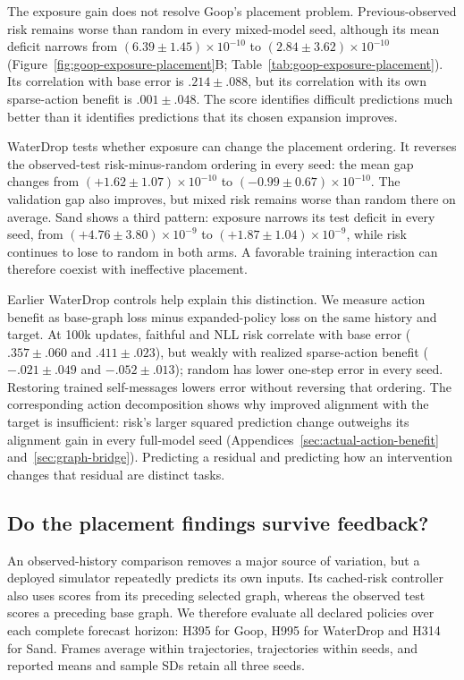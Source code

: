 The exposure gain does not resolve Goop's placement problem. Previous-observed risk remains worse than random in every mixed-model seed, although its mean deficit narrows from $(6.39\pm1.45)\times10^{-10}$ to $(2.84\pm3.62)\times10^{-10}$ (Figure~\ref{fig:goop-exposure-placement}B; Table~\ref{tab:goop-exposure-placement}). Its correlation with base error is $.214\pm.088$, but its correlation with its own sparse-action benefit is $.001\pm.048$. The score identifies difficult predictions much better than it identifies predictions that its chosen expansion improves.

WaterDrop tests whether exposure can change the placement ordering. It reverses the observed-test risk-minus-random ordering in every seed: the mean gap changes from $(+1.62\pm1.07)\times10^{-10}$ to $(-0.99\pm0.67)\times10^{-10}$. The validation gap also improves, but mixed risk remains worse than random there on average. Sand shows a third pattern: exposure narrows its test deficit in every seed, from $(+4.76\pm3.80)\times10^{-9}$ to $(+1.87\pm1.04)\times10^{-9}$, while risk continues to lose to random in both arms. A favorable training interaction can therefore coexist with ineffective placement.


Earlier WaterDrop controls help explain this distinction. We measure action benefit as base-graph loss minus expanded-policy loss on the same history and target. At 100k updates, faithful and NLL risk correlate with base error ($.357\pm.060$ and $.411\pm.023$), but weakly with realized sparse-action benefit ($-.021\pm.049$ and $-.052\pm.013$); random has lower one-step error in every seed. Restoring trained self-messages lowers error without reversing that ordering. The corresponding action decomposition shows why improved alignment with the target is insufficient: risk's larger squared prediction change outweighs its alignment gain in every full-model seed (Appendices~\ref{sec:actual-action-benefit} and~\ref{sec:graph-bridge}). Predicting a residual and predicting how an intervention changes that residual are distinct tasks.

\subsection{Do the placement findings survive feedback?}
An observed-history comparison removes a major source of variation, but a deployed simulator repeatedly predicts its own inputs. Its cached-risk controller also uses scores from its preceding selected graph, whereas the observed test scores a preceding base graph. We therefore evaluate all declared policies over each complete forecast horizon: H395 for Goop, H995 for WaterDrop and H314 for Sand. Frames average within trajectories, trajectories within seeds, and reported means and sample SDs retain all three seeds.

